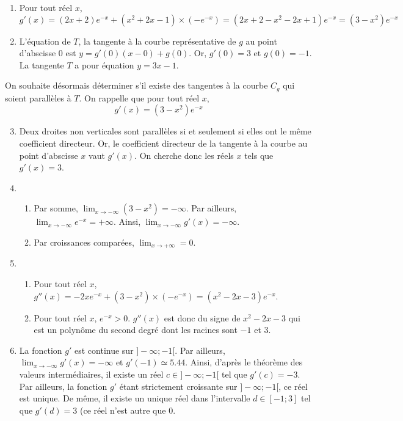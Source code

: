 \documentclass[11pt,fleqn, openany]{book} %
\begin{document}
\begin{solution}
\begin{enumerate}
\item Pour tout réel $x$, $g'(x)=(2x+2)e^{-x}+(x^2+2x-1) \times(-e^{-x})=(2x+2-x^2-2x+1)e^{-x}=(3-x^2)e^{-x}$
\vskip5pt
\item L'équation de $T$, la tangente à la courbe représentative de $g$ au point d'abscisse 0 est $y=g'(0)(x-0)+g(0)$. Or, $g'(0)=3$ et $g(0)=-1$.  La tangente $T$ a pour équation $y=3x-1$.
\end{enumerate}

On souhaite désormais déterminer s'il existe des tangentes à la courbe $C_g$ qui soient parallèles à $T$. On rappelle que pour tout réel $x$, 
\[g'(x)=(3-x^2)e^{-x}\]
\begin{enumerate}
\setcounter{enumi}{2}
\item Deux droites non verticales sont parallèles si et seulement si elles ont le même coefficient directeur. Or, le coefficient directeur de la tangente à la courbe au point d'abscisse $x$ vaut $g'(x)$. On cherche donc les réels $x$ tels que $g'(x)=3$.
\vskip5pt
\item \begin{enumerate}
\item Par somme, $\displaystyle\lim_{x\to -\infty}(3-x^2)=-\infty$. Par ailleurs, $\displaystyle\lim_{x\to -\infty}e^{-x}=+\infty$. Ainsi, $\displaystyle\lim_{x\to -\infty}g'(x)=-\infty$.
\item Par croissances comparées, $\displaystyle\lim_{x\to +\infty}=0$.
\end{enumerate}
\vskip5pt
\item \begin{enumerate}
\item Pour tout réel $x$, $g''(x)=-2xe^{-x}+(3-x^2)\times(-e^{-x})=(x^2-2x-3)e^{-x}$.
\item Pour tout réel $x$, $e^{-x}>0$. $g''(x)$ est donc du signe de $x^2-2x-3$ qui est un polynôme du second degré dont les racines sont $-1$ et 3.

\begin{center}
\end{center}

\end{enumerate}
\vskip5pt
\item La fonction $g'$ est continue sur $]-\infty ; -1[$. Par ailleurs, $\displaystyle\lim_{x\to - \infty}g'(x)=-\infty$ et $g'(-1)\simeq 5.44$. Ainsi, d'après le théorème des valeurs intermédiaires, il existe un réel $c\in ]-\infty ; -1[$ tel que $g'(c)=-3$. Par ailleurs, la fonction $g'$ étant strictement croissante sur $]-\infty ; -1[$, ce réel est unique. De même, il existe un unique réel dans l'intervalle $d\in [-1;3]$ tel que $g'(d)=3$ (ce réel n'est autre que 0.


\end{enumerate}
\end{solution}
\end{document}
